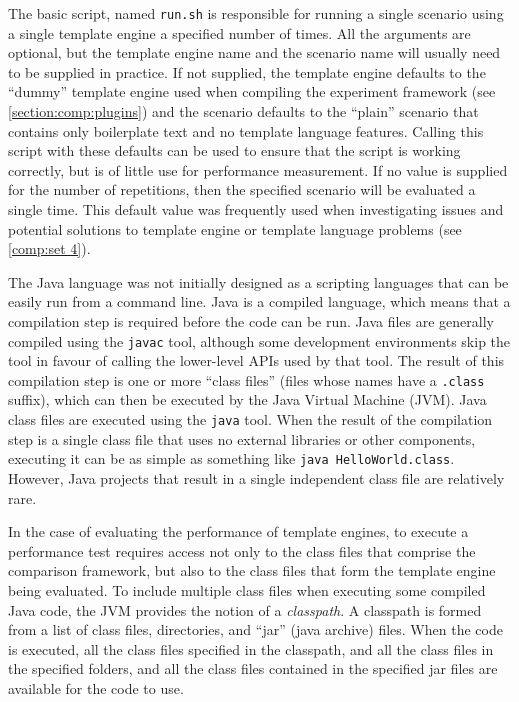 The basic script, named \texttt{run.sh} is responsible for running a single scenario using a single \gls{template engine} a specified number of times. All the arguments are optional, but the \gls{template engine} name and the scenario name will usually need to be supplied in practice. If not supplied, the \gls{template engine} defaults to the \enquote{dummy} \gls{template engine} used when compiling the experiment framework (see \autoref{section:comp:plugins}) and the scenario defaults to the \enquote{plain} scenario that contains only boilerplate text and no \gls{template language} features. Calling this script with these defaults can be used to ensure that the script is working correctly, but is of little use for performance measurement. If no value is supplied for the number of repetitions, then the specified scenario will be evaluated a single time. This default value was frequently used when investigating issues and potential solutions to \gls{template engine} or \gls{template language} problems (see \autoref{comp:set 4}).

The Java language was not initially designed as a scripting languages that can be easily run from a command line. Java is a compiled language, which means that a compilation step is required before the code can be run. Java files are generally compiled using the \verb!javac! tool, although some development environments skip the tool in favour of calling the lower-level APIs used by that tool. The result of this compilation step is one or more \enquote{class files} (files whose names have a \verb!.class! suffix), which can then be executed by the Java Virtual Machine (JVM). Java class files are executed using the \verb!java! tool. When the result of the compilation step is a single class file that uses no external libraries or other components, executing it can be as simple as something like \verb!java HelloWorld.class!. However, Java projects that result in a single independent class file are relatively rare.

In the case of evaluating the performance of \gls{template engine}s, to execute a performance test requires access not only to the class files that comprise the comparison framework, but also to the class files that form the \gls{template engine} being evaluated. To include multiple class files when executing some compiled Java code, the JVM provides the notion of a \emph{\gls{classpath}}. A \gls{classpath} is formed from a list of class files, directories, and \enquote{jar} (java archive) files. When the code is executed, all the class files specified in the \gls{classpath}, and all the class files in the specified folders, and all the class files contained in the specified jar files are available for the code to use.

